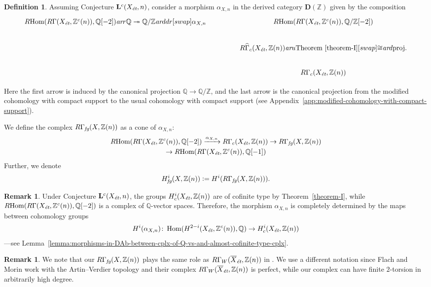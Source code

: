 \documentclass[leqno,12pt]{article}
\theoremstyle{plain}
\theoremstyle{definition}
\newtheorem{definition}[theorem]{\indent\sc Definition}
\newtheorem{remark}[theorem]{\indent\sc Remark}
\DeclareMathOperator{\Hom}{Hom}
\newcommand{\QQ}{\mathbb{Q}}
\newcommand{\ZZ}{\mathbb{Z}}
\newcommand{\dfn}{\mathrel{\mathop:}=}
\newcommand{\ar}{\text{\it ar}}
\newcommand{\et}{\text{\it \'{e}t}}
\newcommand{\fg}{\text{\it fg}}
\newcommand{\RHom}{R\!\Hom}
\newcommand{\DZ}{{\mathbf{D} (\ZZ)}}
\begin{document}
\begin{definition}
  \label{def:RGamma-fg}
  Assuming Conjecture $\mathbf{L}^c (X_\et,n)$, consider a morphism
  $\alpha_{X,n}$ in the derived category $\DZ$ given by the
  composition
  \[ \begin{tikzcd}[column sep=4em]
    \RHom (R\Gamma (X_\et, \ZZ^c (n)), \QQ[-2]) \ar{r}{\QQ \twoheadrightarrow \QQ/\ZZ}\ar{ddr}[swap]{\alpha_{X,n}} & \RHom (R\Gamma (X_\et, \ZZ^c (n)), \QQ/\ZZ[-2]) \\
    & R\widehat{\Gamma}_c (X_\et, \ZZ (n)) \ar{u}{\text{Theorem~\ref{theorem-I}}}[swap]{\cong} \ar{d}{\text{proj.}} \\
    & R\Gamma_c (X_\et, \ZZ (n))
  \end{tikzcd} \]

  Here the first arrow is induced by the canonical projection $\QQ \to \QQ/\ZZ$,
  and the last arrow is the canonical projection from the modified cohomology
  with compact support to the usual cohomology with compact support
  (see Appendix~\ref{app:modified-cohomology-with-compact-support}).

  We define the complex $R\Gamma_\fg (X, \ZZ(n))$ as a cone of $\alpha_{X,n}$:
  \begin{multline*}
    \RHom (R\Gamma (X_\et, \ZZ^c (n)), \QQ [-2]) \xrightarrow{\alpha_{X,n}}
    R\Gamma_c (X_\et, \ZZ (n)) \to
    R\Gamma_\fg (X, \ZZ(n)) \\
    \to \RHom (R\Gamma (X_\et, \ZZ^c (n)), \QQ [-1])
  \end{multline*}
  Further, we denote
  $$H^i_\fg (X, \ZZ (n)) \dfn H^i (R\Gamma_\fg (X, \ZZ (n))).$$
\end{definition}

\begin{remark}
  \label{rmk:alpha-X-n-determined-by-cohomology}
  Under Conjecture $\mathbf{L}^c (X_\et, n)$, the groups
  $H^i_c (X_\et, \ZZ (n))$ are of cofinite type by Theorem~\ref{theorem-I},
  while $\RHom (R\Gamma (X_\et, \ZZ^c (n)), \QQ [-2])$ is a complex of
  $\QQ$-vector spaces. Therefore, the morphism $\alpha_{X,n}$ is completely
  determined by the maps between cohomology groups
  \[ H^i (\alpha_{X,n})\colon
    \Hom (H^{2-i} (X_\et, \ZZ^c (n)), \QQ) \to
    H^i_c (X_\et, \ZZ (n)) \]
  ---see Lemma~\ref{lemma:morphisms-in-DAb-between-cplx-of-Q-vs-and-almost-cofinite-type-cplx}.
\end{remark}

\begin{remark}
  We note that our $R\Gamma_\fg (X, \ZZ (n))$ plays the same role as
  $R\Gamma_W (\overline{X}_\et, \ZZ (n))$ in
  \cite[Definition~3.6]{Flach-Morin-2018}. We use a different notation since
  Flach and Morin work with the Artin--Verdier topology and their complex
  $R\Gamma_W (\overline{X}_\et, \ZZ (n))$ is perfect, while our complex can have
  finite $2$-torsion in arbitrarily high degree.
\end{remark}
\end{document}
